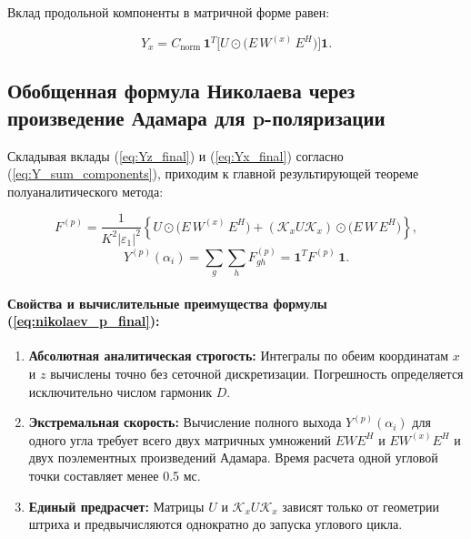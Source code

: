 \documentclass[a4paper,11pt]{article}
\begin{document}
Вклад продольной компоненты в матричной форме равен:
\begin{mathbox}
\begin{equation}
    Y_x = C_{\text{norm}} \, \mathbf{1}^T \Big[ U \odot \big( E \, W^{(x)} \, E^H \big) \Big] \mathbf{1}.
    \label{eq:Yx_final}
\end{equation}
\end{mathbox}

\subsection{Обобщенная формула Николаева через произведение Адамара для p-поляризации}

Складывая вклады (\ref{eq:Yz_final}) и (\ref{eq:Yx_final}) согласно (\ref{eq:Y_sum_components}), приходим к главной результирующей теореме полуаналитического метода:

\begin{mathbox}
\begin{equation}
    F^{(p)} = \frac{1}{K^2 |\varepsilon_1|^2} \left\{ U \odot \big( E \, W^{(x)} \, E^H \big) + (\mathcal{K}_x U \mathcal{K}_x) \odot \big( E \, W \, E^H \big) \right\},
    \label{eq:nikolaev_p_final}
\end{equation}
\begin{equation}
    Y^{(p)}(\alpha_i) = \sum_{g} \sum_{h} F_{gh}^{(p)} = \mathbf{1}^T F^{(p)} \, \mathbf{1}.
    \label{eq:yield_p_sum}
\end{equation}
\end{mathbox}

\paragraph{Свойства и вычислительные преимущества формулы (\ref{eq:nikolaev_p_final}):}
\begin{enumerate}
    \item \textbf{Абсолютная аналитическая строгость:} Интегралы по обеим координатам $x$ и $z$ вычислены точно без сеточной дискретизации. Погрешность определяется исключительно числом гармоник $D$.
    \item \textbf{Экстремальная скорость:} Вычисление полного выхода $Y^{(p)}(\alpha_i)$ для одного угла требует всего двух матричных умножений $E W E^H$ и $E W^{(x)} E^H$ и двух поэлементных произведений Адамара. Время расчета одной угловой точки составляет менее 0.5 мс.
    \item \textbf{Единый предрасчет:} Матрицы $U$ и $\mathcal{K}_x U \mathcal{K}_x$ зависят только от геометрии штриха и предвычисляются однократно до запуска углового цикла.
\end{enumerate}
\end{document}
